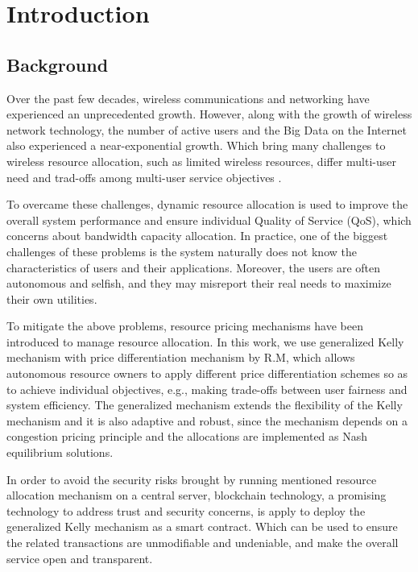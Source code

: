 \chapter{Introduction}
\label{chp:introduction}

\section{Background}

Over the past few decades, wireless communications and networking have experienced an unprecedented growth. However, along with the growth of wireless network technology, the number of active users and the Big Data on the Internet also experienced a near-exponential growth. Which bring many challenges to wireless resource allocation, such as limited wireless resources, differ multi-user need and trad-offs among multi-user service objectives \cite{wang_blockchain-based_2019}. 

To overcame these challenges, dynamic resource allocation is used to improve the overall system performance and ensure individual Quality of Service (QoS), which concerns about bandwidth capacity allocation. In practice, one of the biggest challenges of these problems is the system naturally does not know the characteristics of users and their applications. Moreover, the users are often autonomous and selfish, and they may misreport their real needs to maximize their own utilities. 

To mitigate the above problems, resource pricing mechanisms have been introduced to manage resource allocation. In this work, we use generalized Kelly mechanism with price differentiation mechanism\cite{yang_price_2013} by R.M, which allows autonomous resource owners to apply different price differentiation schemes so as to achieve individual objectives, e.g., making trade-offs between user fairness and system efficiency. The generalized mechanism extends the flexibility of the Kelly mechanism and it is also adaptive and robust, since the mechanism depends on a congestion pricing principle and the allocations are implemented as Nash equilibrium solutions.

In order to avoid the security risks brought by running mentioned resource allocation mechanism on a central server, blockchain technology, a promising technology to address trust and security concerns, is apply to deploy the generalized Kelly mechanism as a smart contract. Which can be used to ensure the related transactions are unmodifiable and undeniable, and make the overall service open and transparent.

